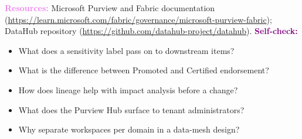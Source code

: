 \documentclass[11pt, a4paper]{article}
\newcommand{\resources}[1]{\vspace{1mm}\noindent\textbf{\textcolor{violet}{Resources:}} #1}
\newcommand{\selfcheck}[1]{\vspace{1mm}\noindent\textbf{\textcolor{purple}{Self-check:}} #1}
\begin{document}
\resources{Microsoft Purview and Fabric documentation (\url{https://learn.microsoft.com/fabric/governance/microsoft-purview-fabric}); DataHub repository (\url{https://github.com/datahub-project/datahub}).}
\selfcheck{
\begin{itemize}[label=$\bullet$, leftmargin=6mm, itemsep=0pt]
    \item What does a sensitivity label pass on to downstream items?
    \item What is the difference between Promoted and Certified endorsement?
    \item How does lineage help with impact analysis before a change?
    \item What does the Purview Hub surface to tenant administrators?
    \item Why separate workspaces per domain in a data-mesh design?
\end{itemize}
}
\end{document}
